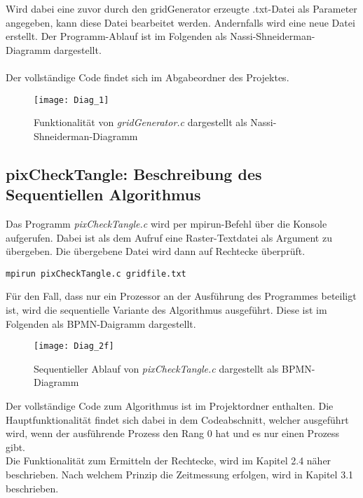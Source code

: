\documentclass[
10pt, %
a4paper, %
oneside, %
headinclude,footinclude, %
BCOR5mm, %
]{scrartcl}
\begin{document}
Wird dabei eine zuvor durch den gridGenerator erzeugte .txt-Datei als Parameter angegeben, kann diese Datei bearbeitet werden. Andernfalls wird eine neue Datei erstellt. Der Programm-Ablauf ist im Folgenden als Nassi-Shneiderman-Diagramm dargestellt.\\
\\Der vollständige Code findet sich im Abgabeordner des Projektes.
\pagebreak

\begin{figure}[h]
	\centering 
	\texttt{[image: Diag\_1]} 
	\caption[Funktionalität von \textit{gridGenerator.c}]{Funktionalität von \textit{gridGenerator.c} dargestellt als Nassi-Shneiderman-Diagramm}
\end{figure}


\subsection{pixCheckTangle: Beschreibung des Sequentiellen Algorithmus}

Das Programm \textit{pixCheckTangle.c} wird per mpirun-Befehl über die Konsole aufgerufen. Dabei ist als dem Aufruf eine Raster-Textdatei als Argument zu übergeben. Die übergebene Datei wird dann auf Rechtecke überprüft.\\

\begin{lstlisting}
mpirun pixCheckTangle.c gridfile.txt
\end{lstlisting}

Für den Fall, dass nur ein Prozessor an der Ausführung des Programmes beteiligt ist, wird die sequentielle Variante des Algorithmus ausgeführt. Diese ist im Folgenden als BPMN-Daigramm dargestellt.

\begin{figure}[h]
	\centering 
	\texttt{[image: Diag\_2f]} 
	\caption[Funktionalität von \textit{pixCheckTangle.c} sequentiell]{Sequentieller Ablauf von \textit{pixCheckTangle.c} dargestellt als BPMN-Diagramm }
	
\end{figure}

Der vollständige Code zum Algorithmus ist im Projektordner enthalten. Die Hauptfunktionalität findet sich dabei in dem Codeabschnitt, welcher ausgeführt wird, wenn der ausführende Prozess den Rang 0 hat und es nur einen Prozess gibt.\\
Die Funktionalität zum Ermitteln der Rechtecke, wird im Kapitel 2.4 näher beschrieben. Nach welchem Prinzip die Zeitmessung erfolgen, wird in Kapitel 3.1 beschrieben.
\end{document}
